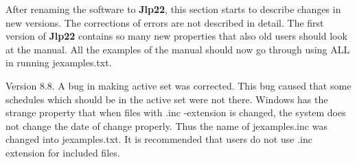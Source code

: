  
 
After renaming the software to \textbf{Jlp22}, this section starts to describe changes in new versions. 
The corrections of errors are not described in detail. The first version of \textbf{Jlp22} contains so many new properties that also old users 
should look at the manual. All the examples of the manual should now go through using ALL in running 
jexamples.txt. 
 
Version 8.8. A bug in making active set was corrected. This bug caused that some schedules which should be 
in the active set were not there. Windows has the strange property that when files with .inc -extension 
is changed, the system does not change the date of change properly. Thus the name of jexamples.inc was changed 
into jexamples.txt. It is recommended that users do not use .inc extension for included files. 
 
